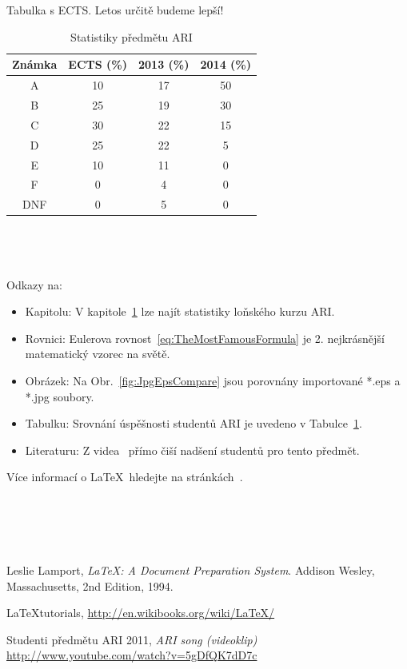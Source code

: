 \documentclass[twoside]{article}
\begin{document}
\newpage{}

\subsection{~}
Tabulka s ECTS. Letos určitě budeme lepší!
\label{sec:Tab}
\begin{table}[htb]%
\centering
\begin{tabular}{c|c|c|c}
Známka & ECTS (\%) & 2013 (\%) & 2014 (\%)\\
\hline
A 	& 10 	& 17 	& 50\\
B 	& 25 	& 19 	& 30\\
C 	& 30 	& 22 	& 15\\
D 	& 25 	& 22 	& 5 \\
E 	& 10 	& 11 	& 0	\\
F 	& 0 	& 4 	& 0	\\
DNF	& 0 	& 5 	& 0
\end{tabular}
\caption{Statistiky předmětu ARI}
\label{tab:AriStats}
\end{table}

\subsection{~}
\label{sec:Ref}
Odkazy na:
\begin{itemize}
	\item Kapitolu: V kapitole~\ref{tab:AriStats} lze najít statistiky loňského kurzu ARI.
	\item Rovnici: Eulerova rovnost~\ref{eq:TheMostFamousFormula} je 2. nejkrásnější matematický vzorec na světě.
	\item Obrázek: Na Obr.~\ref{fig:JpgEpsCompare} jsou porovnány importované *.eps a *.jpg soubory.
	\item Tabulku: Srovnání úspěšnosti studentů ARI je uvedeno v Tabulce~\ref{tab:AriStats}.
	\item Literaturu: Z videa~\cite{ARI11} přímo čiší nadšení studentů pro tento předmět.
\end{itemize}
Více informací o \LaTeX \ hledejte na stránkách~\cite{Wiki}.


\section{~}
\label{sec:ukol2}


\begin{thebibliography}{9}

  Leslie Lamport,
  \emph{\LaTeX: A Document Preparation System}.
  Addison Wesley, Massachusetts,
  2nd Edition,
  1994.

	\LaTeX tutorials, \url{http://en.wikibooks.org/wiki/LaTeX/}

	Studenti předmětu ARI 2011, \emph{ARI song (videoklip)} \url{http://www.youtube.com/watch?v=5gDfQK7dD7c}
\end{thebibliography}
\end{document}
